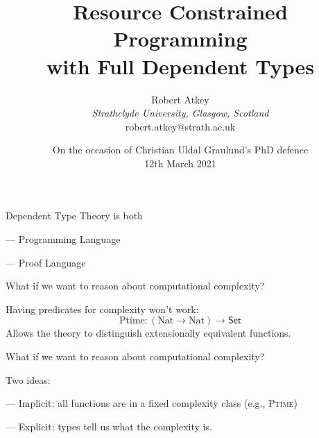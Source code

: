 \documentclass[xetex,serif,mathserif,aspectratio=169]{beamer}
\title{Resource Constrained Programming \\ with Full Dependent Types}
\author{Robert Atkey \\
  \emph{Strathclyde University, Glasgow, Scotland} \\
  robert.atkey@strath.ac.uk}
\date{On the occasion of Christian Uldal Graulund’s PhD defence \\
12th March 2021}
\newcommand{\youtem}{\quad \textcolor{titlered!80}{---} \quad}
\newcommand{\HEAD}[1]{\textcolor{titlered}{#1}}
\begin{document}
\frame{\titlepage}





\begin{frame}

  \HEAD{Dependent Type Theory is both}

  \bigskip

  \youtem Programming Language

  \raggedleft {}

  \raggedright

  \medskip

  \youtem Proof Language

  \raggedleft {}


  \pause \pause \pause

\end{frame}

\begin{frame}

  What if we want to reason about computational complexity?

  \pause
  \bigskip

  Having predicates for complexity won't work:
  \begin{displaymath}
    \mathrm{Ptime} : (\mathrm{Nat} \to \mathrm{Nat}) \to \mathsf{Set}
  \end{displaymath}
  Allows the theory to distinguish extensionally equivalent functions.

\end{frame}

\begin{frame}

  What if we want to reason about computational complexity?

  \pause
  \bigskip

  Two ideas:

  \medskip

  \youtem Implicit: all functions are in a fixed complexity class (e.g., \textsc{Ptime})

  \medskip

  \youtem Explicit: types tell us what the complexity is.

\end{frame}
\end{document}
